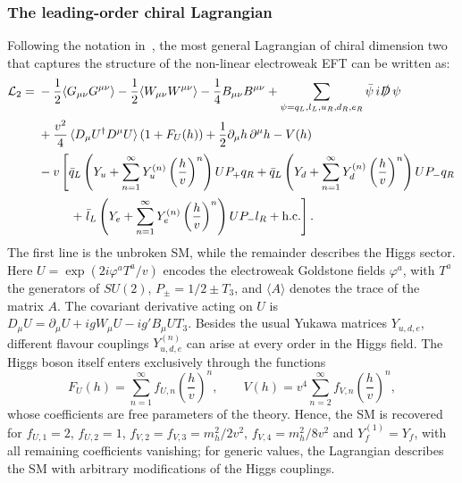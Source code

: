 \subsubsection{The leading-order chiral Lagrangian}
Following the notation in~\cite{Buchalla:2018yce}, the most general Lagrangian of chiral dimension two that captures the structure of the non-linear electroweak EFT can be written as:
\begin{equation}
\begin{split}
    \mathcal{L}_2 =\;& -\frac{1}{2}\langle G_{\mu\nu}G^{\mu\nu}\rangle
    - \frac{1}{2}\langle W_{\mu\nu}W^{\mu\nu}\rangle
    - \frac{1}{4}B_{\mu\nu}B^{\mu\nu}
    + \sum_{\psi=q_L,l_L,u_R,d_R,e_R}\bar{\psi}\,i\slashed{D}\,\psi \\[2pt]
    &+ \frac{v^2}{4}\,\langle D_\mu U^\dagger D^\mu U\rangle\left(1+F_U(h)\right)
    + \frac{1}{2}\partial_\mu h\,\partial^\mu h - V(h) \\[2pt]
    &- v\left[\bar{q}_L\left(Y_u + \sum_{n=1}^{\infty}Y_u^{(n)}
      \left(\frac{h}{v}\right)^{n}\right)U P_+ q_R
    + \bar{q}_L\left(Y_d + \sum_{n=1}^{\infty}Y_d^{(n)}
      \left(\frac{h}{v}\right)^{n}\right)U P_- q_R \right. \\[2pt]
    &\qquad\;\; \left. + \;\bar{l}_L\left(Y_e + \sum_{n=1}^{\infty}Y_e^{(n)}
      \left(\frac{h}{v}\right)^{n}\right)U P_- l_R + \text{h.c.}\right].
\end{split}
\label{eq:heft_L2}
\end{equation}
%
The first line is the unbroken SM, while the remainder describes the Higgs sector. Here $U=\exp\left(2i\varphi^a T^a/v\right)$ encodes the electroweak Goldstone fields $\varphi^a$, with $T^a$ the generators of $SU(2)$, $P_\pm = 1/2 \pm T_3$, and $\langle A \rangle$ denotes the trace of the matrix $A$. The covariant derivative acting on $U$ is $D_\mu U = \partial_\mu U + i g W_\mu U - i g' B_\mu U T_3$. Besides the usual Yukawa matrices $Y_{u,d,e}$, different flavour couplings $Y^{(n)}_{u,d,e}$ can arise at every order in the Higgs field. The Higgs boson itself enters exclusively through the functions
\begin{equation}
    F_U(h) = \sum_{n=1}^{\infty} f_{U,n}\left(\frac{h}{v}\right)^{n}, \qquad
    V(h) = v^4 \sum_{n=2}^{\infty} f_{V,n}\left(\frac{h}{v}\right)^{n},
\label{eq:heft_FU}
\end{equation}
whose coefficients are free parameters of the theory. Hence, the SM is recovered for $f_{U,1}=2$, $f_{U,2}=1$, $f_{V,2}=f_{V,3}=m_h^2/2v^2$, $f_{V,4}=m_h^2/8v^2$ and $Y_f^{(1)}=Y_f$, with all remaining coefficients vanishing;  for generic values, the Lagrangian describes the SM with arbitrary modifications of the Higgs couplings.

